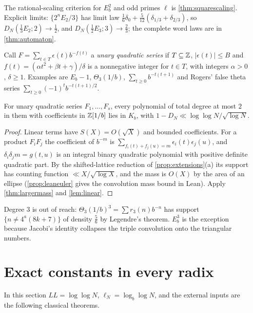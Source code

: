 \documentclass[11pt]{article}
\newcommand{\LL}{\log\log N}
\begin{document}
The rational-scaling criterion for $E_b^2$ and odd primes $\ell$ is
\cref{thm:squarescaling}. Explicit limits: $\{2^nE_2/3\}$ has limit law
$\frac16\delta_0+\frac5{12}(\delta_{1/3}+\delta_{2/3})$, so $D_N(\frac13E_2;2)\to\frac12$,
and $D_N(\frac12E_3;3)\to\frac23$; the complete word laws are in \cref{thm:automaton}.

Call $F=\sum_{t\in T}\epsilon(t)b^{-f(t)}$ a \emph{unary quadratic series} if $T\subseteq\mathbb Z$,
$|\epsilon(t)|\le B$ and $f(t)=(\alpha t^2+\beta t+\gamma)/\delta$ is a nonnegative integer
for $t\in T$, with integers $\alpha>0$, $\delta\ge1$. Examples are $E_b-1$,
$\Theta_3(1/b)$, $\sum_{t\ge0}b^{-t(t+1)}$ and Rogers' false theta series
$\sum_{t\ge0}(-1)^tb^{-t(t+1)/2}$.

\begin{theorem}\label{thm:unary}
For unary quadratic series $F_1,\dots,F_s$, every polynomial of total degree at most $2$
in them with coefficients in $\mathbb Z[1/b]$ lies in $K_b$, with
$1-D_N\ll\LL/\sqrt{\log N}$.
\end{theorem}

\begin{proof}
Linear terms have $S(X)=O(\sqrt X)$ and bounded coefficients. For a product $F_iF_j$ the
coefficient of $b^{-m}$ is $\sum_{f_i(t)+f_j(u)=m}\epsilon_i(t)\epsilon_j(u)$, and
$\delta_i\delta_jm=g(t,u)$ is an integral binary quadratic polynomial with positive definite
quadratic part. By the shifted-lattice reduction of \cref{prop:extensions}(a) its support
has counting function $\ll X/\sqrt{\log X}$, and the mass is $O(X)$ by the area of an ellipse
(\cref{prop:leaneuler} gives the convolution mass bound in Lean). Apply
\cref{thm:largermass} and \cref{lem:linear}.
\end{proof}

Degree $3$ is out of reach: $\Theta_3(1/b)^3=\sum r_3(n)b^{-n}$ has support
$\{n\ne4^a(8k+7)\}$ of density $\frac56$ by Legendre's theorem. $E_b^3$ is the exception
because Jacobi's identity collapses the triple convolution onto the triangular numbers.

\section{Exact constants in every radix}\label{sec:radix}

In this section $LL=\log\log N$, $\ell_N=\log_b\log N$, and the external inputs are the
following classical theorems.
\end{document}
